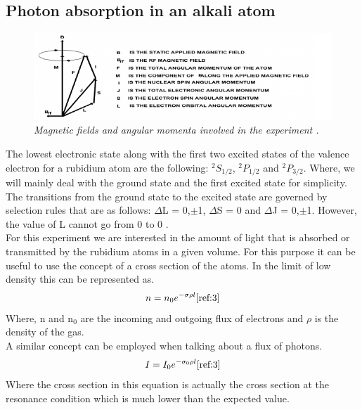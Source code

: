 \documentclass[twocolumn]{article}
\begin{document}
\subsection{Photon absorption in an alkali atom}
\begin{figure}
\begin{minipage}[t]{\textwidth}
\includegraphics[width=\linewidth]{pictures/all-vectors.png}
\caption{\textit{Magnetic fields and angular momenta involved in the experiment 
\cite{ref:3}.}}
\label{fig:8}
\end{minipage}
\end{figure}
The lowest electronic state along with the first two excited states of the 
valence electron for a rubidium atom are the following: $^2S_{1/2}$, 
$^2P_{1/2}$ and $^2P_{3/2}$. Where, we will mainly deal with the ground state 
and the first excited state for simplicity.
\\
The transitions from the ground state to the excited state are governed by 
selection rules that are as follows: $\Delta$L = 0,$\pm$1, $\Delta$S = 0 and 
$\Delta$J = 0,$\pm$1. However, the value of L cannot go from 0 to 0 
\cite{ref:3}.
\\
For this experiment we are interested in the amount of light that is absorbed 
or transmitted by the rubidium atoms in a given volume. For this purpose it can 
be useful to use the concept of a cross section of the atoms. In the limit of 
low density this can be represented as.
\begin{equation}
n = n_0e^{-\sigma\rho l}
\label{eqn:14}
\cite{ref:3}
\end{equation}
Where, n and n$_0$ are the incoming and outgoing flux of electrons and $\rho$ 
is the density of the gas.
\\
A similar concept can be employed when talking about a flux of photons.
\begin{equation}
I = I_0 e^{-\sigma_0\rho l}
\label{eqn:15}
\cite{ref:3}
\end{equation}
Where the cross section in this equation is actually the cross section at the 
resonance condition which is much lower than the expected value.
\end{document}

